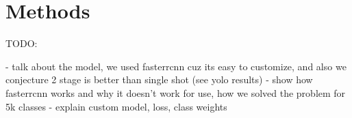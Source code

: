 \section{Methods}
\label{sec:methods}

TODO:


- talk about the model, we used fasterrcnn cuz its easy to customize, and also we conjecture 2 stage is better than single shot (see yolo results)
- show how fasterrcnn works and why it doesn't work for use, how we solved the problem for 5k classes
- explain custom model, loss, class weights
